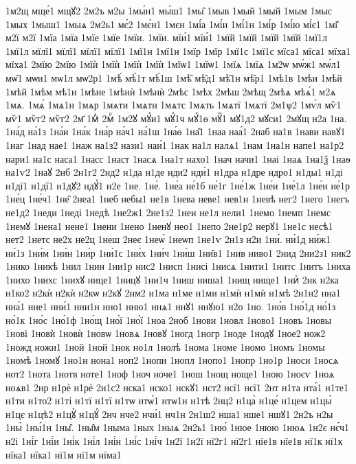 {1м2щ
мще́1
мщꙋ2
2м2ъ
м2ы
1мы́н1
мы́ш1
1мы̑
1мыв
1мый
1мый
1мым
1мыс
1мых
1мыш1
1мыѧ
2м2ь1
мє́2
1мє́н1
1мєн
1мі́а
1мі́и
1мі́1н
1мі́р
1мі́ю
мі́є1
1мі̑
м2ї
м2ї
1мїа
1мїа
1мїе
1мїе
1мїи.
1мїи.
мїи́1
мїи́1
1мїй
1мїй
1мїй
1мїй
1мї1л
1мї1л
мїлї1
мїлї1
мїлї1
мїлї1
1мї1н
1мї1н
1мїр
1мїр
1мї1с
1мї1с
мїса1
мїса1
мїха1
мїха1
2мїю
2мїю
1мїѝ
1мїѝ
1мїѝ
1мїѝ
1мїѡ1
1мїѡ1
1мїѧ
1мїѧ
1м2ѡ
мѡ́ж1
мѡ́л1
мѡ̑1
мѡи1
мѡ1л
мѡ2р1
1мѣ́
мѣ́1т
мѣ́1ш
1мѣ̑
мѣ̑д1
мѣ̑1н
мѣ̑р1
1мѣ1в
1мѣи
1мѣй
1мѣй
1мѣм
мѣ1н
1мѣне
1мѣнѝ
1мѣнѝ
2мѣс
1мѣх
2мѣш
2мѣщ
2мѣѧ
мѣѧ́1
м2ѧ
1мѧ.
1мѧ́
1мѧ1н
1мѧр
1мѧти
1мѧтн
1мѧтс
1мѧть
1мѧтї
1мѧтї
2м1ѱ2
1мѵ́л
мѷ1
мѷ1
мѷг2
мѷг2
2м҃
1мⷣ
2мⷬ
1м2ꙋ
мꙋ́и1
мꙋ́1ч
мꙋ́1ѳ
мꙋ̑1
мꙋ1д2
мꙋси1
2мꙋщ
н2а
1на.
1на́д
на́1з
1на́и
1на́к
1на́р
на́ч1
на́1ш
1на́ѳ
1на̑1
1наа
наа́1
2наб
на1в
1нави
навꙋ1
1наг
1над
нае1
1наж
на1з2
нази1
наи́1
1нак
на1л
налѧ1
1нам
1на1н
напе1
на1р2
нари1
на1с
наса1
1насс
1наст
1насѧ
1на1т
нахо1
1нач
начи1
1наі
1наѧ
1на1ѯ
1наѳ
на1ѵ2
1наꙋ
2нб
2н1г2
2нд2
н1да
н1де
нди2
нди́1
н1дра
н1дре
ндро1
н1ды1
н1ді
н1дї1
н1дї1
н1дꙋ2
ндꙋ́1
н2е
1не.
1не́.
1не́а
не́1б
не́1г
1не́1ж
1не́и
1не́1л
1не́н
не́1р
1не́ц
1не́ч1
1не̑
2неа1
1неб
небы1
не1в
1нева
неве1
нев1н
1невѣ
нег2
1него
1негъ
не1д2
1неди
1неді
1недѣ
1не2ж1
2не1з2
1неи
не1л
нели1
1немо
1немп
1немс
1немꙋ
1нена1
нене1
1нени
1нено
1ненꙋ
нео1
1непо
2не1р2
нерꙋ1
1не1с
несѣ1
нет2
1нетс
не2х
не2ц
1неш
2неє
1неѡ́
1неѡп
1не1ѵ
2н1з
н2и
1ни́.
ни́1д
ни́ж1
ни́1з
1ни́м
1ни́н
1ни́р
1ни́1с
1ни́х
1ни́ч
1ни́ш
1ни̑в1
1нив
ниво1
2нид
2ни2з1
ник2
1нико
1никѣ
1нил
1нин
1ни1р
нис2
1нисп
1нисі
1нисѧ
1нити1
1нитс
1нитъ
1ниха
1нихо
1нихс
1нихꙋ
нице1
1ницꙋ
1ни1ч
1ниш
ниша1
1нищ
нище1
1ниⷯ
2нк
н2ка
н1ко2
н2кѝ
н2кѝ
н2кѡ
н2кꙋ
2нм2
н1ма
н1ме
н1ми
н1мѝ
н1мѝ
н1мѣ
2н1н2
нна1
нна́1
нне1
нни́1
нни1н
нно1
нню1
ннѧ1
ннꙋ1
ннꙋю1
н2о
1но.
1но́в
1но́1д
но́1з
но́1к
1но́с
1но́1ф
1но́щ
1но́ї
1но́ї
1ноа
2ноб
1нови
1новл
1ново1
1новъ
1новы
1нові
1новѝ
1новѝ
1новѡ
1новѧ
1новꙋ
1ногд
1ногр
1ноде
1нодꙋ
1ное2
нож2
1ножд
ножи1
1ной
1ной
1нок
но1л
1нолѣ
1нома
1номе
1номо
1номъ
1номы
1номѣ
1номꙋ
1но1н
нона1
ноп2
1нопи
1нопл
1нопо1
1нопр
1но1р
1носи
1носѧ
нот2
1нота
1нотв
ноте1
1ноф
1ноч
ноче1
1нош
1нощ
ноще1
1ною
1ноєѵ
1ноѧ
ноѧв1
2нр
н1рѐ
н1рѐ
2н1с2
нска1
нско1
нскꙋ1
нст2
нсї1
нсї1
2нт
н1та
нта́1
н1те1
н1ти
н1то2
н1ті
н1тї
н1тї
н1тѡ
нтѡ́1
нтѡ1н
н1тѣ
2нц2
н1ца̀
н1це́
н1цем
н1цы̀
н1цє
н1цѣ2
н1цꙋ̀
н1цꙋ́
2нч
нче2
нчи́1
нч1н
2н1ш2
нша1
нше1
ншꙋ1
2н2ъ
н2ы
1ны̀
1ны́1н
1ны̑.
1ны̑м
1ныма
1ных
1ныѧ
2н2ь1
1ню́
1нюе
1нюю
1нюѧ
1н2є
нє́ч1
н2і
1ні́г
1ні́и
1ні́к
1ні́л
1ні́н
1ні́с
1ні́ч
1н2ї
1н2ї
нї2г1
нї2г1
нїе1в
нїе1в
нї1к
нї1к
нїка1
нїка1
нї1м
нї1м
нїма1
}
